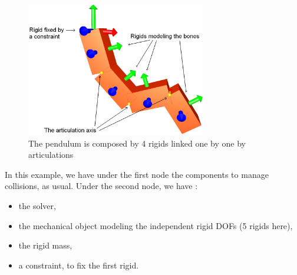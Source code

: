 \begin{figure}[htpb]
	\centering
		\includegraphics[width=0.70\textwidth]{articulatedbodies/softArt_snapshot.png}
	\caption{The pendulum is composed by 4 rigids linked one by one by articulations}
\end{figure}

In this example, we have under the first node the components to manage collisions, as usual.
Under the second node, we have :
\begin{itemize}
	\item the solver,
	\item the mechanical object modeling the independent rigid DOFs (5 rigids here),
	\item the rigid mass,
	\item a constraint, to fix the first rigid.
\end{itemize}

